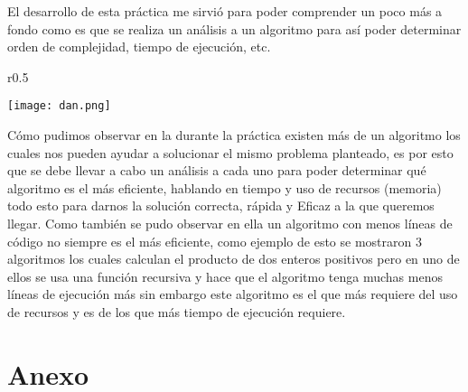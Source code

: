 \documentclass[12pt,twoside]{article}
\begin{document}
El desarrollo de esta práctica me sirvió para poder comprender un poco más a fondo como es que se realiza un análisis a un algoritmo para así poder determinar orden de complejidad, tiempo de ejecución, etc.
\begin{wrapfigure}{r}{0.5\textwidth}
  \begin{center}
    \texttt{[image: dan.png]}
\end{center}
\end{wrapfigure}
Cómo pudimos observar en la durante la práctica existen más de un algoritmo los cuales nos pueden ayudar a solucionar el mismo problema planteado, es por esto que se debe llevar a cabo un análisis a cada uno para poder determinar qué algoritmo es el más eficiente, hablando en tiempo y uso de recursos (memoria) todo esto para darnos la solución correcta, rápida y Eficaz a la que queremos llegar. Como también se pudo observar en ella un algoritmo con menos líneas de código no siempre es el más eficiente, como ejemplo de esto se mostraron 3 algoritmos los cuales calculan el producto de dos enteros positivos pero en uno de ellos se usa una función recursiva y hace que el algoritmo tenga muchas menos líneas de ejecución más sin embargo este algoritmo es el que más requiere del uso de recursos y es de los que más tiempo de ejecución requiere.
\section{Anexo}
\end{document}
